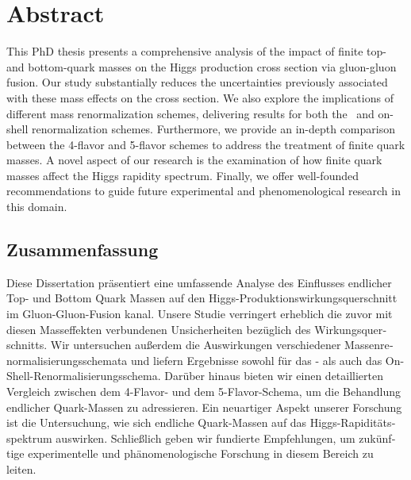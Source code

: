 \begingroup
\let\clearpage\relax
\let\cleardoublepage\relax
\let\cleardoublepage\relax
\chapter*{Abstract}

This PhD thesis presents a comprehensive analysis of the impact of finite top- and bottom-quark masses on the Higgs production cross section via gluon-gluon fusion. Our study substantially reduces the uncertainties previously associated with these mass effects on the cross section. We also explore the implications of different mass renormalization schemes, delivering results for both the \MS\ and on-shell renormalization schemes. Furthermore, we provide an in-depth comparison between the 4-flavor and 5-flavor schemes to address the treatment of finite quark masses. A novel aspect of our research is the examination of how finite quark masses affect the Higgs rapidity spectrum. Finally, we offer well-founded recommendations to guide future experimental and phenomenological research in this domain.

\newpage
\begin{otherlanguage}{ngerman}
\chapter*{Zusammenfassung}
Diese Dissertation präsentiert eine umfassende Analyse des Einflusses endlicher Top- und Bottom Quark Massen auf den Higgs-Produktionswirkungsquerschnitt im Gluon-Gluon-Fusion kanal. Unsere Studie verringert erheblich die zuvor mit diesen Masseffekten verbundenen Unsicherheiten bezüglich des Wirkungsquerschnitts. Wir untersuchen außerdem die Auswirkungen verschiedener Massenrenormalisierungsschemata und liefern Ergebnisse sowohl für das \MS- als auch das On-Shell-Renormalisierungsschema. Darüber hinaus bieten wir einen detaillierten Vergleich zwischen dem 4-Flavor- und dem 5-Flavor-Schema, um die Behandlung endlicher Quark-Massen zu adressieren. Ein neuartiger Aspekt unserer Forschung ist die Untersuchung, wie sich endliche Quark-Massen auf das Higgs-Rapiditätsspektrum auswirken. Schließlich geben wir fundierte Empfehlungen, um zukünftige experimentelle und phänomenologische Forschung in diesem Bereich zu leiten.

\end{otherlanguage}

\endgroup

\vfill

